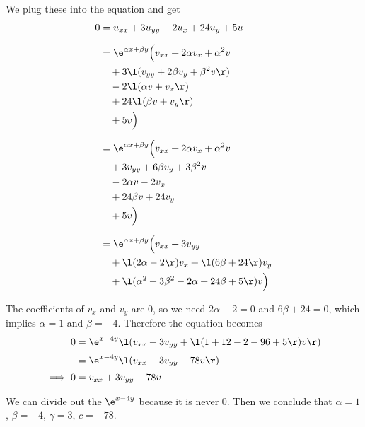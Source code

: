 \documentclass[a4paper]{article}
\begin{document}
We plug these into the equation and get \[ \begin{split}
0 &= u_{xx} + 3 u_{yy} - 2 u_x + 24 u_y + 5u \\[1.5ex]
&= \e^{\alpha x + \beta y} \Big(
    v_{xx} + 2\alpha v_x + \alpha^2 v \\
    &\quad + 3 \l( v_{yy} + 2\beta v_y + \beta^2 v \r) \\
    &\quad - 2 \l( \alpha v + v_x \r) \\
    &\quad + 24 \l( \beta v + v_y \r) \\
    &\quad + 5v
\Big) \\[1.5ex]
&= \e^{\alpha x + \beta y} \Big(
    v_{xx} + 2 \alpha v_x + \alpha^2 v \\
    &\quad + 3 v_{yy} + 6 \beta v_y + 3 \beta^2 v \\
    &\quad - 2 \alpha v - 2 v_x \\
    &\quad + 24 \beta v + 24 v_y \\
    &\quad + 5v
\Big) \\[1.5ex]
&= \e^{\alpha x + \beta y} \Big(
    v_{xx} + 3 v_{yy} \\
    &\quad + \l( 2\alpha - 2 \r) v_x + \l( 6\beta + 24 \r) v_y \\
    &\quad + \l( \alpha^2 + 3\beta^2 - 2\alpha + 24\beta + 5 \r) v
\Big)
\end{split} \]

The coefficients of $v_x$ and $v_y$ are 0, so we need $2\alpha - 2 = 0$ and $6\beta + 24 = 0$, which implies $\alpha = 1$ and $\beta = -4$. Therefore the equation becomes
\begin{align*}
0 &= \e^{x - 4y} \l(
    v_{xx} + 3 v_{yy}
    + \l( 1 + 12 - 2 - 96 + 5 \r) v
\r) \\[0.5ex]
&= \e^{x - 4y} \l(
    v_{xx} + 3 v_{yy}
    - 78 v
\r) \\[0.5ex]
\implies 0 &= v_{xx} + 3 v_{yy} - 78 v
\end{align*}

We can divide out the $\e^{x - 4y}$ because it is never 0. Then we conclude that $\alpha = 1$, $\beta = -4$, $\gamma = 3$, $c = -78$.

\end{document}
